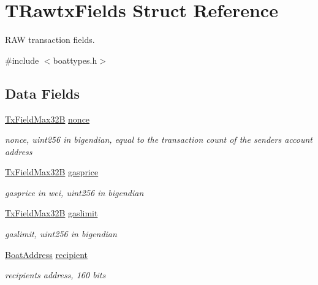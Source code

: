 \hypertarget{struct_t_rawtx_fields}{}\section{T\+Rawtx\+Fields Struct Reference}
\label{struct_t_rawtx_fields}


R\+AW transaction fields.  




{\ttfamily \#include $<$boattypes.\+h$>$}

\subsection*{Data Fields}
\begin{DoxyCompactItemize}
\item 
\mbox{\hyperlink{boattypes_8h_af8a3635bb5261915dff042bd32f3466b}{Tx\+Field\+Max32B}} \mbox{\hyperlink{struct_t_rawtx_fields_ad1d39f55c87a8c8c7ffa505466e4e5b7}{nonce}}
\begin{DoxyCompactList}\small\item\em nonce, uint256 in bigendian, equal to the transaction count of the sender\textquotesingle{}s account address \end{DoxyCompactList}\item 
\mbox{\hyperlink{boattypes_8h_af8a3635bb5261915dff042bd32f3466b}{Tx\+Field\+Max32B}} \mbox{\hyperlink{struct_t_rawtx_fields_aa1618d84e9c13b48f6724f547039f6e2}{gasprice}}
\begin{DoxyCompactList}\small\item\em gasprice in wei, uint256 in bigendian \end{DoxyCompactList}\item 
\mbox{\hyperlink{boattypes_8h_af8a3635bb5261915dff042bd32f3466b}{Tx\+Field\+Max32B}} \mbox{\hyperlink{struct_t_rawtx_fields_a95792a919f98aadb60695a2b6b900b41}{gaslimit}}
\begin{DoxyCompactList}\small\item\em gaslimit, uint256 in bigendian \end{DoxyCompactList}\item 
\mbox{\hyperlink{boattypes_8h_a18be901fd00e05c6acdbdbab722c6c58}{Boat\+Address}} \mbox{\hyperlink{struct_t_rawtx_fields_ab59fdcc512bfe81db16707e037dbab5b}{recipient}}
\begin{DoxyCompactList}\small\item\em recipient\textquotesingle{}s address, 160 bits \end{DoxyCompactList}\item 

\end{DoxyCompactItemize}
